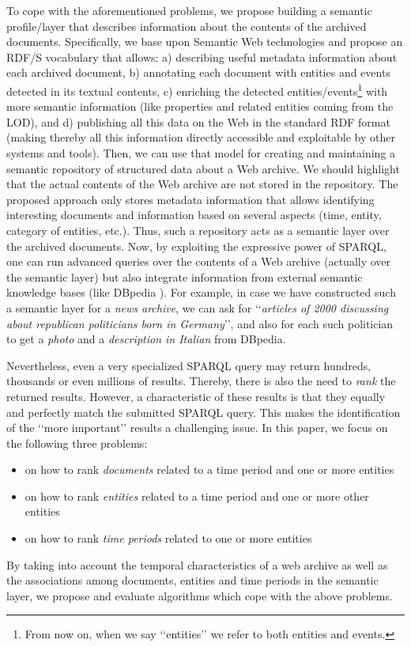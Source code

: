 \documentclass[runningheads,a4paper]{libtex/llncs}
\newcommand{\q}[1]{\lq\lq{}{}#1\rq\rq{}{}}
\begin{document}

To cope with the aforementioned problems,
we propose building a semantic profile/layer that describes information about
the contents of the archived documents.
Specifically, we base upon Semantic Web technologies and
propose an RDF/S vocabulary that allows:
a) describing useful metadata information about each archived document,
b) annotating each document with entities and events detected in its textual contents,
c) enriching the detected entities/events\footnote{From now on,
    when we say \q{entities} we refer to both entities and events.} with more semantic information
   (like properties and related entities coming from the LOD), and
d) publishing all this data on the Web in the standard RDF format
   (making thereby all this information directly accessible and exploitable by other systems and tools).
Then, we can use that model for creating and maintaining a semantic repository
of structured data about a Web archive.
We should highlight that the actual contents of the Web archive are not
stored in the repository.
The proposed approach only stores metadata information
that allows identifying interesting documents and information based on
several aspects (time, entity, category of entities, etc.).
Thus, such a repository acts as a semantic layer over the archived documents.
Now, by exploiting the expressive power of SPARQL,
one can run advanced queries over the contents of a Web archive (actually over the semantic layer)
but also integrate information from external semantic knowledge bases (like DBpedia \cite{lehmann2015dbpedia}).
For example, in case we have constructed such a semantic layer for a {\em news archive},
we can ask for
\q{{\em articles of 2000 discussing about republican politicians born in Germany}},
and also for each such politician to get a {\em photo} and a {\em description in Italian} from DBpedia.

Nevertheless, even a very specialized SPARQL query may return hundreds,
thousands or even millions of results.
Thereby, there is also the need to {\em rank} the returned results.
However, a characteristic of these results is that
they equally and perfectly match the submitted SPARQL query.
This makes the identification of the \q{more important} results a challenging issue.
In this paper, we focus on the following three problems:
\begin{itemize}
\item on how to rank {\em documents} related to a time period and one or more entities
\item on how to rank {\em entities} related to a time period and one or more other entities
\item on how to rank {\em time periods} related to one or more entities
\end{itemize}
By taking into account the temporal characteristics of a web archive as well as
the associations among documents, entities and time periods in the semantic layer,
we propose and evaluate algorithms which cope with the above problems.
\end{document}
